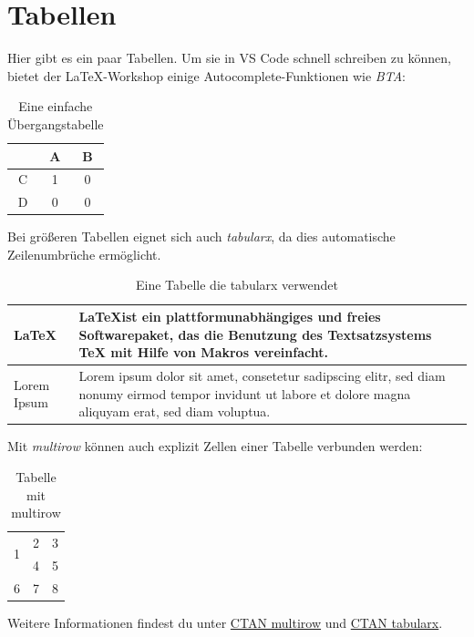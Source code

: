 \section{Tabellen}
\label{sec:tabellen}

Hier gibt es ein paar Tabellen. Um sie in VS Code schnell schreiben zu können, bietet der \LaTeX-Workshop einige Autocomplete-Funktionen wie \textit{BTA}:

\begin{table}[ht]
    \centering
    \begin{tabular}{|c|cc|}
        \hline
         & A & B \\
        \hline
        C & 1 & 0 \\
        D & 0 & 0 \\
        \hline
    \end{tabular}
    \caption{Eine einfache Übergangstabelle}
    \label{tab:simpleTable}
\end{table}

Bei größeren Tabellen eignet sich auch \textit{tabularx}, da dies automatische Zeilenumbrüche ermöglicht.

\begin{table}[ht]
    \centering
    \begin{tabularx}{0.9\textwidth}{|X|X|}
        \hline
        \LaTeX & \LaTeX ist ein plattformunabhängiges und freies Softwarepaket, das die Benutzung des Textsatzsystems TeX mit Hilfe von Makros vereinfacht.\\
        \hline
        Lorem Ipsum & Lorem ipsum dolor sit amet, consetetur sadipscing elitr, sed diam nonumy eirmod tempor invidunt ut labore et dolore magna aliquyam erat, sed diam voluptua. \\
        \hline
    \end{tabularx}
    \caption{Eine Tabelle die tabularx verwendet}
    \label{tab:tabularx}
\end{table}

Mit \textit{multirow} können auch explizit Zellen einer Tabelle verbunden werden:

\begin{table}[ht]
    \centering
    \begin{tabular}{|c|c|c|}
        \hline
        \multirow{2}{*}{1} & 2 & 3 \\
         & 4 & 5 \\\hline
        6 & 7 & 8 \\\hline
    \end{tabular}
    \caption{Tabelle mit multirow}
    \label{tab:multirow}
\end{table}

Weitere Informationen findest du unter \href{https://ctan.org/pkg/multirow}{CTAN multirow} und \href{https://ctan.org/pkg/tabularx}{CTAN tabularx}.